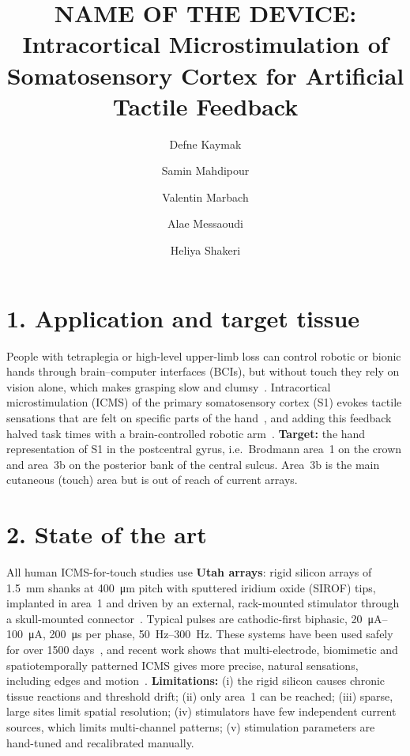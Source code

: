 \documentclass[11pt]{article}
\title{NAME OF THE DEVICE: Intracortical Microstimulation of Somatosensory Cortex for Artificial Tactile Feedback}
\author{Defne Kaymak \and Samin Mahdipour \and Valentin Marbach \and Alae Messaoudi \and Heliya Shakeri}
\begin{document}
\maketitle
 
\section*{1. Application and target tissue}
People with tetraplegia or high-level upper-limb loss can control robotic or bionic hands through brain--computer interfaces (BCIs), but without touch they rely on vision alone, which makes grasping slow and clumsy~\cite{bensmaia2014,clement2011}. Intracortical microstimulation (ICMS) of the primary somatosensory cortex (S1) evokes tactile sensations that are felt on specific parts of the hand~\cite{flesher2016}, and adding this feedback halved task times with a brain-controlled robotic arm~\cite{flesher2021}. \textbf{Target:} the hand representation of S1 in the postcentral gyrus, i.e.\ Brodmann area~1 on the crown and area~3b on the posterior bank of the central sulcus. Area~3b is the main cutaneous (touch) area but is out of reach of current arrays.
 
\section*{2. State of the art}
All human ICMS-for-touch studies use \textbf{Utah arrays}: rigid silicon arrays of \SI{1.5}{mm} shanks at \SI{400}{\micro m} pitch with sputtered iridium oxide (SIROF) tips, implanted in area~1 and driven by an external, rack-mounted stimulator through a skull-mounted connector~\cite{flesher2016,hughes2021}. Typical pulses are cathodic-first biphasic, \SIrange{20}{100}{\micro A}, \SI{200}{\micro s} per phase, \SIrange{50}{300}{Hz}. These systems have been used safely for over 1500 days~\cite{hughes2021}, and recent work shows that multi-electrode, biomimetic and spatiotemporally patterned ICMS gives more precise, natural sensations, including edges and motion~\cite{greenspon2023,greenspon2025,valle2025}. \textbf{Limitations:} (i) the rigid silicon causes chronic tissue reactions and threshold drift; (ii) only area~1 can be reached; (iii) sparse, large sites limit spatial resolution; (iv) stimulators have few independent current sources, which limits multi-channel patterns; (v) stimulation parameters are hand-tuned and recalibrated manually.
 
\end{document}
